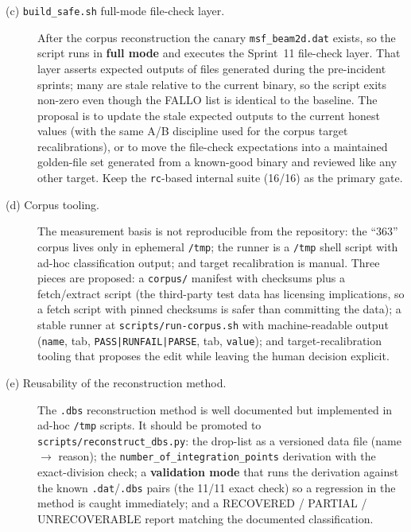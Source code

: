 \documentclass[11pt,a4paper]{report}
\newcommand{\code}[1]{\texttt{#1}}
\begin{document}
\begin{description}
  \item[(c) \code{build\_\allowbreak safe.sh} full-mode file-check layer.] After the corpus
        reconstruction the canary \code{msf\_\allowbreak beam2d.dat} exists, so the script
        runs in \textbf{full mode} and executes the Sprint~11 file-check layer.
        That layer asserts expected outputs of files generated during the
        pre-incident sprints; many are stale relative to the current binary, so
        the script exits non-zero even though the FALLO list is identical to the
        baseline. The proposal is to update the stale expected outputs to the
        current honest values (with the same A/B discipline used for the corpus
        target recalibrations), or to move the file-check expectations into a
        maintained golden-file set generated from a known-good binary and
        reviewed like any other target. Keep the \code{rc}-based internal suite
        (16/16) as the primary gate.

  \item[(d) Corpus tooling.] The measurement basis is not reproducible from the
        repository: the ``363'' corpus lives only in ephemeral \code{/\allowbreak tmp}; the
        runner is a \code{/\allowbreak tmp} shell script with ad-hoc classification output;
        and target recalibration is manual. Three pieces are proposed: a
        \code{corpus/\allowbreak } manifest with checksums plus a fetch/extract script (the
        third-party test data has licensing implications, so a fetch script with
        pinned checksums is safer than committing the data); a stable runner at
        \code{scripts/\allowbreak run-corpus.sh} with machine-readable output
        (\code{name}, tab, \code{PASS|RUNFAIL|PARSE}, tab, \code{value}); and
        target-recalibration tooling that proposes the edit while leaving the
        human decision explicit.

  \item[(e) Reusability of the reconstruction method.] The \code{.dbs}
        reconstruction method is well documented but implemented in ad-hoc
        \code{/\allowbreak tmp} scripts. It should be promoted to
        \code{scripts/\allowbreak reconstruct\_\allowbreak dbs.py}: the drop-list as a versioned data file
        (name $\rightarrow$ reason); the \code{number\_\allowbreak of\_\allowbreak integration\_\allowbreak points}
        derivation with the exact-division check; a \textbf{validation mode} that
        runs the derivation against the known \code{.dat}/\code{.dbs} pairs (the
        11/11 exact check) so a regression in the method is caught immediately;
        and a RECOVERED / PARTIAL / UNRECOVERABLE report matching the documented
        classification.


\end{description}
\end{document}
